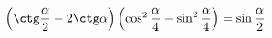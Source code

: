 \begin{ex}[type=prove_identity]
	\begin{condition}
		\( \left( \ctg\dfrac{\alpha}{2}-2\ctg\alpha \right)\left( \cos^2\dfrac{\alpha}{4}-\sin^2\dfrac{\alpha}{4} \right)=\sin\dfrac{\alpha}{2} \)
	\end{condition}
\end{ex}